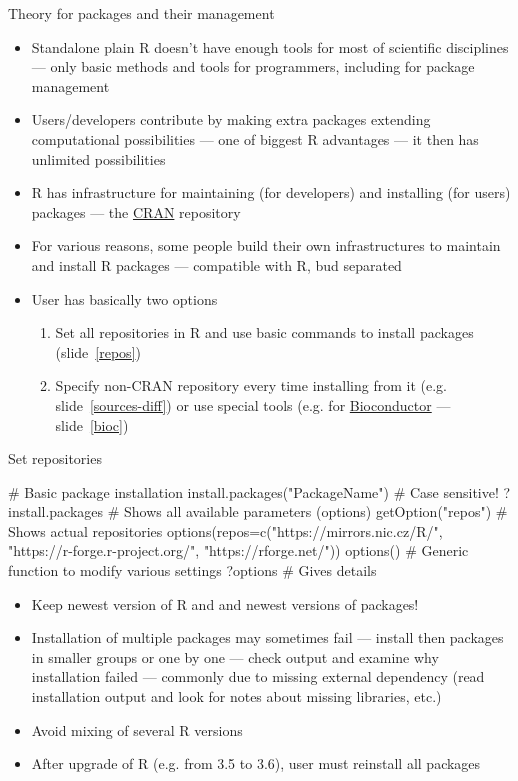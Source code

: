 \documentclass[compress, ucs, xelatex, 11pt, xcolor=svgnames, aspectratio=169,
	hyperref={
		bookmarks=true,
		unicode=true,
		colorlinks=true,
		pdftitle={Molecular data in R},
		plainpages=false,
		pdfauthor={Vojtech Zeisek},
		pdfsubject={Course about phylogeny and evolution in R},
		pdfcreator={XeLaTeX},
		pdfkeywords={R, evolution, phylogeny, molecular data},
		linkcolor=Crimson, %
		anchorcolor=Magenta, %
		citecolor=Magenta, %
		filecolor=Magenta, %
		menucolor=Magenta, %
		urlcolor=DodgerBlue, %
		pdftex},
	url={hyphens, lowtilde} %
	]{beamer}
\begin{document}
\begin{frame}{Theory for packages and their management}
	\begin{itemize}
		\item Standalone plain R doesn't have enough tools for most of scientific disciplines --- only basic methods and tools for programmers, including for package management
		\item Users/developers contribute by making extra packages extending computational possibilities --- one of biggest R advantages --- it then has unlimited possibilities
		\item R has infrastructure for maintaining (for developers) and installing (for users) packages --- the \href{https://CRAN.R-project.org/}{CRAN} repository
		\item For various reasons, some people build their own infrastructures to maintain and install R packages --- compatible with R, bud separated
		\item User has basically two options
		\begin{enumerate}
			\item Set all repositories in R and use basic commands to install packages (slide~\ref{repos})
			\item Specify non-CRAN repository every time installing from it (e.g. slide~\ref{sources-diff}) or use special tools (e.g. for \href{https://bioconductor.org/install/}{Bioconductor} --- slide~\ref{bioc})
		\end{enumerate}
	\end{itemize}
\end{frame}

\begin{frame}[fragile]{Set repositories}
	\label{repos}
	\begin{spluscode}
    # Basic package installation
    install.packages("PackageName") # Case sensitive!
    ?install.packages # Shows all available parameters (options)
    getOption("repos") # Shows actual repositories
    options(repos=c("https://mirrors.nic.cz/R/",
      "https://r-forge.r-project.org/", "https://rforge.net/"))
    options() # Generic function to modify various settings
    ?options # Gives details
	\end{spluscode}
	\begin{itemize}
		\item \alert{Keep newest version of R and and newest versions of packages!}
		\item Installation of multiple packages may sometimes fail --- install then packages in smaller groups or one by one --- check output and examine why installation failed --- commonly due to missing external dependency (read installation output and look for notes about missing libraries, etc.)
		\item Avoid mixing of several R versions
		\item After upgrade of R (e.g. from 3.5 to 3.6), user must reinstall all packages
	\end{itemize}
\end{frame}
\end{document}
